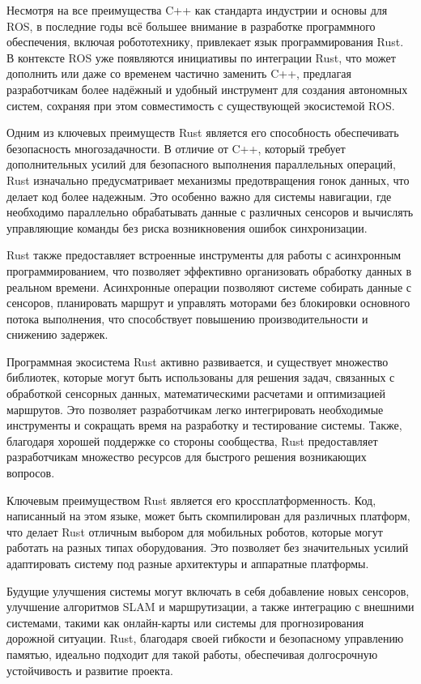 Несмотря на все преимущества C++ как стандарта индустрии и основы для ROS, в
последние годы всё большее внимание в разработке программного обеспечения,
включая робототехнику, привлекает язык программирования Rust. В контексте ROS
уже появляются инициативы по интеграции Rust, что может дополнить или даже со
временем частично заменить C++, предлагая разработчикам более надёжный и удобный
инструмент для создания автономных систем, сохраняя при этом совместимость с
существующей экосистемой ROS.

Одним из ключевых преимуществ Rust является его способность обеспечивать
безопасность многозадачности. В отличие от C++, который требует дополнительных
усилий для безопасного выполнения параллельных операций, Rust изначально
предусматривает механизмы предотвращения гонок данных, что делает код более
надежным. Это особенно важно для системы навигации, где необходимо параллельно
обрабатывать данные с различных сенсоров и вычислять управляющие команды без
риска возникновения ошибок синхронизации.

Rust также предоставляет встроенные инструменты для работы с асинхронным
программированием, что позволяет эффективно организовать обработку данных в
реальном времени. Асинхронные операции позволяют системе собирать данные с
сенсоров, планировать маршрут и управлять моторами без блокировки основного
потока выполнения, что способствует повышению производительности и снижению
задержек.

Программная экосистема Rust активно развивается, и существует множество
библиотек, которые могут быть использованы для решения задач, связанных с
обработкой сенсорных данных, математическими расчетами и оптимизацией маршрутов.
Это позволяет разработчикам легко интегрировать необходимые инструменты и
сокращать время на разработку и тестирование системы. Также, благодаря хорошей
поддержке со стороны сообщества, Rust предоставляет разработчикам множество
ресурсов для быстрого решения возникающих вопросов.

Ключевым преимуществом Rust является его кроссплатформенность. Код, написанный
на этом языке, может быть скомпилирован для различных платформ, что делает Rust
отличным выбором для мобильных роботов, которые могут работать на разных типах
оборудования. Это позволяет без значительных усилий адаптировать систему под
разные архитектуры и аппаратные платформы.

Будущие улучшения системы могут включать в себя добавление новых сенсоров,
улучшение алгоритмов SLAM и маршрутизации, а также интеграцию с внешними
системами, такими как онлайн-карты или системы для прогнозирования дорожной
ситуации. Rust, благодаря своей гибкости и безопасному управлению памятью,
идеально подходит для такой работы, обеспечивая долгосрочную устойчивость и
развитие проекта.

